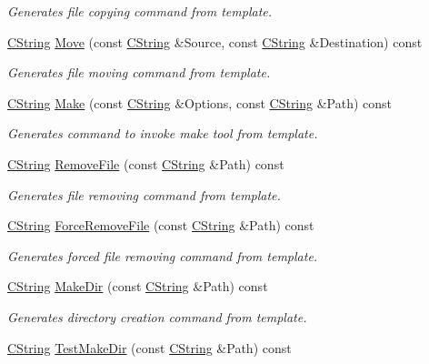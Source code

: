 \begin{DoxyCompactItemize}
\begin{DoxyCompactList}\small\item\em Generates file copying command from template. \end{DoxyCompactList}\item 
\hyperlink{classCString}{C\-String} \hyperlink{classCPlatform_a6e873836070cf09aefcdc94840e78108}{Move} (const \hyperlink{classCString}{C\-String} \&Source, const \hyperlink{classCString}{C\-String} \&Destination) const 
\begin{DoxyCompactList}\small\item\em Generates file moving command from template. \end{DoxyCompactList}\item 
\hyperlink{classCString}{C\-String} \hyperlink{classCPlatform_ad008cab9685a9b7b7df3a6de4f38ceba}{Make} (const \hyperlink{classCString}{C\-String} \&Options, const \hyperlink{classCString}{C\-String} \&Path) const 
\begin{DoxyCompactList}\small\item\em Generates command to invoke make tool from template. \end{DoxyCompactList}\item 
\hyperlink{classCString}{C\-String} \hyperlink{classCPlatform_add0052fcc1e98d057d080234b5f25407}{Remove\-File} (const \hyperlink{classCString}{C\-String} \&Path) const 
\begin{DoxyCompactList}\small\item\em Generates file removing command from template. \end{DoxyCompactList}\item 
\hyperlink{classCString}{C\-String} \hyperlink{classCPlatform_a6a57e3c731c705f1395b712c58fed853}{Force\-Remove\-File} (const \hyperlink{classCString}{C\-String} \&Path) const 
\begin{DoxyCompactList}\small\item\em Generates forced file removing command from template. \end{DoxyCompactList}\item 
\hyperlink{classCString}{C\-String} \hyperlink{classCPlatform_a914fe20e0c5da8987c58dbc34e6f0298}{Make\-Dir} (const \hyperlink{classCString}{C\-String} \&Path) const 
\begin{DoxyCompactList}\small\item\em Generates directory creation command from template. \end{DoxyCompactList}\item 
\hyperlink{classCString}{C\-String} \hyperlink{classCPlatform_a0a30cf91f3d95f95d4a6950a1f2838e1}{Test\-Make\-Dir} (const \hyperlink{classCString}{C\-String} \&Path) const 

\end{DoxyCompactItemize}
